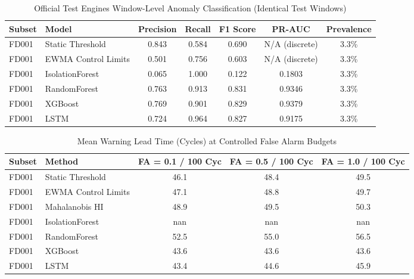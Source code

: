\begin{table}[htbp]
\centering
\small
\caption{Official Test Engines Window-Level Anomaly Classification (Identical Test Windows)}
\label{tab:test_anomaly_metrics}
\begin{tabular}{llccccc}
\toprule
\textbf{Subset} & \textbf{Model} & \textbf{Precision} & \textbf{Recall} & \textbf{F1 Score} & \textbf{PR-AUC} & \textbf{Prevalence} \\
\midrule
FD001 & Static Threshold & 0.843 & 0.584 & 0.690 & N/A (discrete) & 3.3\% \\
FD001 & EWMA Control Limits & 0.501 & 0.756 & 0.603 & N/A (discrete) & 3.3\% \\
FD001 & IsolationForest & 0.065 & 1.000 & 0.122 & 0.1803 & 3.3\% \\
FD001 & RandomForest & 0.763 & 0.913 & 0.831 & 0.9346 & 3.3\% \\
FD001 & XGBoost & 0.769 & 0.901 & 0.829 & 0.9379 & 3.3\% \\
FD001 & LSTM & 0.724 & 0.964 & 0.827 & 0.9175 & 3.3\% \\
\bottomrule
\end{tabular}
\end{table}


\begin{table}[htbp]
\centering
\small
\caption{Mean Warning Lead Time (Cycles) at Controlled False Alarm Budgets}
\label{tab:lead_time_fa_budgets}
\begin{tabular}{llccc}
\toprule
\textbf{Subset} & \textbf{Method} & \textbf{FA = 0.1 / 100 Cyc} & \textbf{FA = 0.5 / 100 Cyc} & \textbf{FA = 1.0 / 100 Cyc} \\
\midrule
FD001 & Static Threshold & 46.1 & 48.4 & 49.5 \\
FD001 & EWMA Control Limits & 47.1 & 48.8 & 49.7 \\
FD001 & Mahalanobis HI & 48.9 & 49.5 & 50.3 \\
FD001 & IsolationForest & nan & nan & nan \\
FD001 & RandomForest & 52.5 & 55.0 & 56.5 \\
FD001 & XGBoost & 43.6 & 43.6 & 43.6 \\
FD001 & LSTM & 43.4 & 44.6 & 45.9 \\
\bottomrule
\end{tabular}
\end{table}


